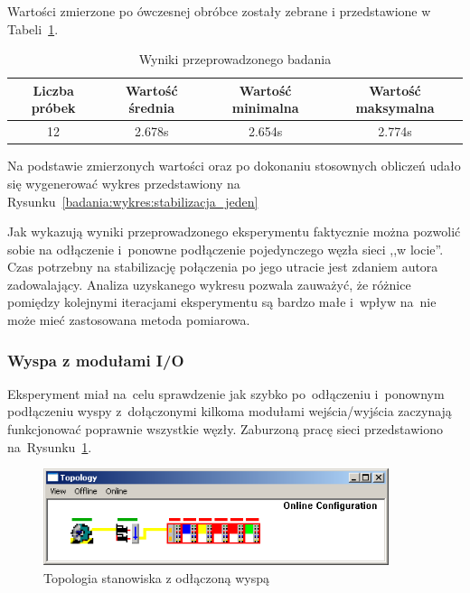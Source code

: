 Wartości zmierzone po ówczesnej obróbce zostały zebrane i przedstawione w Tabeli~\ref{badania:wyniki:stabilizacja_jeden}.
\begin{table}[!htb]
\begin{center}
\begin{tabular}{| c | c | c | c |}\hline
\textbf{Liczba próbek} & \textbf{Wartość średnia} & \textbf{Wartość minimalna} & \textbf{Wartość maksymalna} \\\hline\hline
12 & 2.678s & 2.654s & 2.774s \\\hline
\end{tabular}
\end{center}
\vspace*{-6mm}
  \caption{Wyniki przeprowadzonego badania}
	\label{badania:wyniki:stabilizacja_jeden}
\end{table}
Na podstawie zmierzonych wartości oraz po dokonaniu stosownych obliczeń udało się wygenerować wykres przedstawiony na Rysunku~\ref{badania:wykres:stabilizacja_jeden}


Jak wykazują wyniki przeprowadzonego eksperymentu faktycznie można pozwolić sobie na odłączenie i~ponowne podłączenie pojedynczego węzła sieci ,,w locie''. Czas potrzebny na stabilizację połączenia po jego utracie jest zdaniem autora zadowalający. Analiza uzyskanego wykresu pozwala zauważyć, że różnice pomiędzy kolejnymi iteracjami eksperymentu są bardzo małe i~wpływ na~nie może mieć zastosowana metoda pomiarowa.

\subsubsection{Wyspa z modułami I/O}
Eksperyment miał na~celu sprawdzenie jak szybko po~odłączeniu i~ponownym podłączeniu wyspy z~dołączonymi kilkoma modułami wejścia/wyjścia zaczynają funkcjonować poprawnie wszystkie węzły. Zaburzoną pracę sieci przedstawiono na~Rysunku~\ref{coupler}.
\begin{figure}[!htb] 	\centering 	\includegraphics[width=0.9\textwidth]{images/topologyCPerror} \caption{Topologia stanowiska z odłączoną wyspą} \label{coupler} \end{figure}

